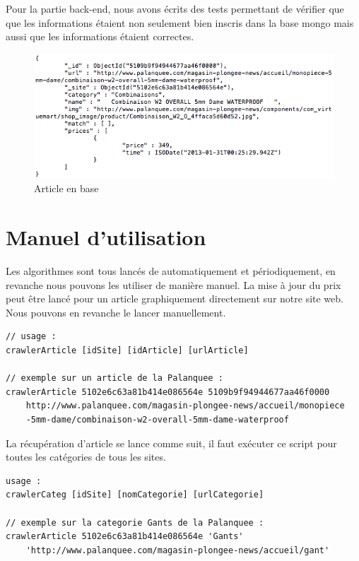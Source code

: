 \documentclass{report}
\begin{document}
Pour la partie back-end, nous avons écrits des tests permettant de vérifier que que les informations étaient non seulement bien inscris dans la base mongo mais aussi que les informations étaient correctes.\\
\begin{figure}[h]
\begin{center}
\includegraphics[scale = 0.7]{./img/article.png}
\caption{Article en base}
\end{center}
\end{figure}

\chapter{Manuel d'utilisation}
Les algorithmes sont tous lancés de automatiquement et périodiquement, en revanche nous pouvons les utiliser de manière manuel. La mise à jour du prix peut être lancé pour un article graphiquement directement sur notre site web.\\
Nous pouvons en revanche le lancer manuellement.
\begin{lstlisting}
// usage :
crawlerArticle [idSite] [idArticle] [urlArticle]

// exemple sur un article de la Palanquee :
crawlerArticle 5102e6c63a81b414e086564e 5109b9f94944677aa46f0000
	http://www.palanquee.com/magasin-plongee-news/accueil/monopiece
	-5mm-dame/combinaison-w2-overall-5mm-dame-waterproof
\end{lstlisting}

La récupération d'article se lance comme suit, il faut exécuter ce script pour toutes les catégories de tous les sites.
\begin{lstlisting}
usage :
crawlerCateg [idSite] [nomCategorie] [urlCategorie]

// exemple sur la categorie Gants de la Palanquee :
crawlerArticle 5102e6c63a81b414e086564e 'Gants'
	'http://www.palanquee.com/magasin-plongee-news/accueil/gant'
\end{lstlisting}
\end{document}
